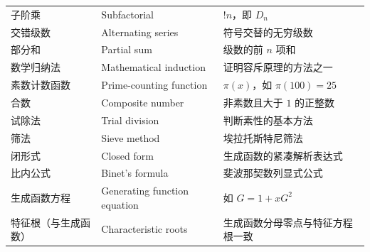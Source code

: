 \documentclass[UTF8,11pt,a4paper]{ctexbook}   %
\theoremstyle{definition}
\begin{document}
\begin{longtable}{|p{4.8cm}|p{4.8cm}|p{4.8cm}|}
子阶乘 & Subfactorial & $!n$，即 $D_n$ \\
交错级数 & Alternating series & 符号交替的无穷级数 \\
部分和 & Partial sum & 级数的前 $n$ 项和 \\
数学归纳法 & Mathematical induction & 证明容斥原理的方法之一 \\
素数计数函数 & Prime-counting function & $\pi(x)$，如 $\pi(100)=25$ \\
合数 & Composite number & 非素数且大于 $1$ 的正整数 \\
试除法 & Trial division & 判断素性的基本方法 \\
筛法 & Sieve method & 埃拉托斯特尼筛法 \\
闭形式 & Closed form & 生成函数的紧凑解析表达式 \\
比内公式 & Binet's formula & 斐波那契数列显式公式 \\
生成函数方程 & Generating function equation & 如 $G=1+xG^2$ \\
特征根（与生成函数） & Characteristic roots & 生成函数分母零点与特征方程根一致 \\
\hline
\end{longtable}
\end{document}
